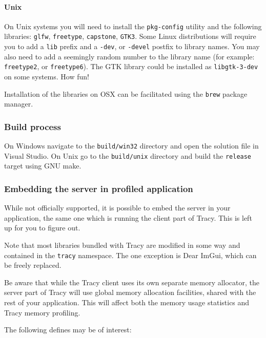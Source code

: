 \documentclass[hidelinks,titlepage,a4paper]{article}
\begin{document}
\paragraph{Unix}

On Unix systems you will need to install the \texttt{pkg-config} utility and the following libraries: \texttt{glfw}, \texttt{freetype}, \texttt{capstone}, \texttt{GTK3}. Some Linux distributions will require you to add a \texttt{lib} prefix and a \texttt{-dev}, or \texttt{-devel} postfix to library names. You may also need to add a seemingly random number to the library name (for example: \texttt{freetype2}, or \texttt{freetype6}). The GTK library could be installed as \texttt{libgtk-3-dev} on some systems. How fun!

Installation of the libraries on OSX can be facilitated using the \texttt{brew} package manager.

\subsubsection{Build process}

On Windows navigate to the \texttt{build/win32} directory and open the solution file in Visual Studio. On Unix go to the \texttt{build/unix} directory and build the \texttt{release} target using GNU make.

\subsubsection{Embedding the server in profiled application}
\label{embeddingserver}

While not officially supported, it is possible to embed the server in your application, the same one which is running the client part of Tracy. This is left up for you to figure out.

Note that most libraries bundled with Tracy are modified in some way and contained in the \texttt{tracy} namespace. The one exception is Dear ImGui, which can be freely replaced.

Be aware that while the Tracy client uses its own separate memory allocator, the server part of Tracy will use global memory allocation facilities, shared with the rest of your application. This will affect both the memory usage statistics and Tracy memory profiling.

The following defines may be of interest:
\end{document}

